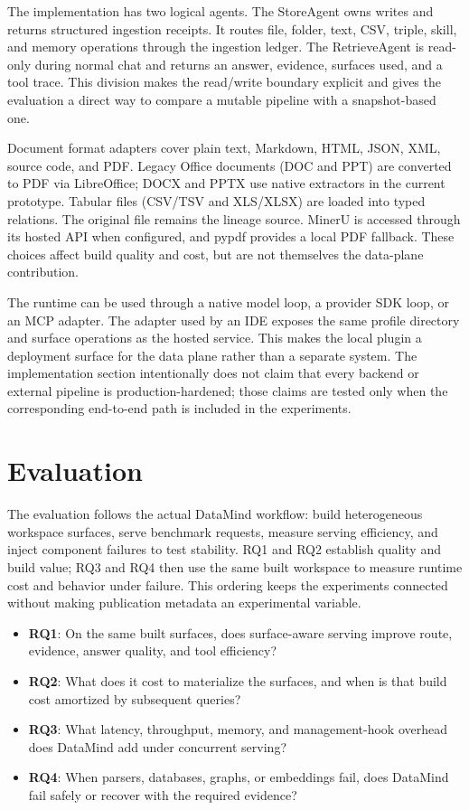 The implementation has two logical agents. The StoreAgent owns writes and
returns structured ingestion receipts. It routes file, folder, text, CSV,
triple, skill, and memory operations through the ingestion ledger. The
RetrieveAgent is read-only during normal chat and returns an answer, evidence,
surfaces used, and a tool trace. This division makes the read/write boundary
explicit and gives the evaluation a direct way to compare a mutable pipeline
with a snapshot-based one.

Document format adapters cover plain text, Markdown, HTML, JSON, XML, source
code, and PDF. Legacy Office documents (DOC and PPT) are converted to PDF via
LibreOffice; DOCX and PPTX use native extractors in the current prototype.
Tabular files (CSV/TSV and XLS/XLSX) are loaded into typed relations. The original file remains the
lineage source. MinerU is accessed through its hosted API when configured, and
pypdf provides a local PDF fallback. These choices affect build quality and
cost, but are not themselves the data-plane contribution.

The runtime can be used through a native model loop, a provider SDK loop, or an
MCP adapter. The adapter used by an IDE exposes the same profile directory and
surface operations as the hosted service. This makes the local plugin a
deployment surface for the data plane rather than a separate system. The
implementation section intentionally does not claim that every backend or
external pipeline is production-hardened; those claims are tested only when
the corresponding end-to-end path is included in the experiments.

\section{Evaluation}
\label{sec:experiments}

The evaluation follows the actual DataMind workflow: build heterogeneous
workspace surfaces, serve benchmark requests, measure serving efficiency, and
inject component failures to test stability. RQ1 and RQ2 establish quality and
build value; RQ3 and RQ4 then use the same built workspace to measure runtime
cost and behavior under failure. This ordering keeps the experiments connected
without making publication metadata an experimental variable.

\begin{itemize}
  \item \textbf{RQ1}: On the same built surfaces, does surface-aware serving
  improve route, evidence, answer quality, and tool efficiency?
  \item \textbf{RQ2}: What does it cost to materialize the surfaces, and when
  is that build cost amortized by subsequent queries?
  \item \textbf{RQ3}: What latency, throughput, memory, and management-hook
  overhead does DataMind add under concurrent serving?
  \item \textbf{RQ4}: When parsers, databases, graphs, or embeddings fail, does
  DataMind fail safely or recover with the required evidence?
\end{itemize}

